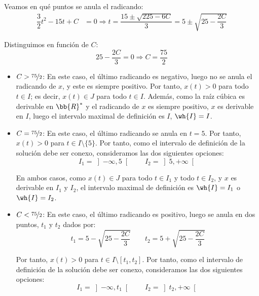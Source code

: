 \begin{ejercicio}
\begin{itemize}
        Veamos en qué puntos se anula el radicando:
        \begin{align*}
            \dfrac{3}{2}t^2 - 15t + C &= 0 \Longrightarrow t = \dfrac{15\pm\sqrt{225-6C}}{3} = 5\pm\sqrt{25-\dfrac{2C}{3}}
        \end{align*}

        Distinguimos en función de $C$:
        \begin{equation*}
            25 - \dfrac{2C}{3} = 0 \Longrightarrow C = \dfrac{75}{2}
        \end{equation*}
        \begin{itemize}
            \item \ul{$C>\nicefrac{75}{2}$}: En este caso, el último radicando es negativo, luego no se anula el radicando de $x$, y este es siempre positivo. Por tanto, $x(t)>0$ para todo $t\in I$; es decir, $x(t)\in J$ para todo $t\in I$. Además, como la raíz cúbica es derivable en $\bb{R}^\ast$ y el radicando de $x$ es siempre positivo, $x$ es derivable en $I$, luego el intervalo maximal de definición es $I$, $\wh{I}=I$.
            
            \item \ul{$C=\nicefrac{75}{2}$}: En este caso, el último radicando se anula en $t=5$. Por tanto, $x(t)>0$ para $t\in I\setminus \{5\}$. Por tanto, como el intervalo de definición de la solución debe ser conexo, consideramos las dos siguientes opciones:
            \begin{equation*}
                I_1 = \left]-\infty, 5\right[ \qquad I_2 = \left]5, +\infty\right[
            \end{equation*}

            En ambos casos, como $x(t)\in J$ para todo $t\in I_1$ y todo $t\in I_2$, y $x$ es derivable en $I_1$ y $I_2$, el intervalo maximal de definición es $\wh{I}=I_1$ o $\wh{I}=I_2$.

            \item \ul{$C<\nicefrac{75}{2}$}: En este caso, el último radicando es positivo, luego se anula en dos puntos, $t_1$ y $t_2$ dados por:
            \begin{equation*}
                t_1 = 5-\sqrt{25-\dfrac{2C}{3}} \qquad t_2 = 5+\sqrt{25-\dfrac{2C}{3}}
            \end{equation*}

            Por tanto, $x(t)>0$ para $t\in I\setminus [t_1,t_2]$. Por tanto, como el intervalo de definición de la solución debe ser conexo, consideramos las dos siguientes opciones:
            \begin{equation*}
                I_1 = \left]-\infty, t_1\right[ \qquad I_2 = \left]t_2, +\infty\right[
            \end{equation*}


\end{itemize}
\end{itemize}
\end{ejercicio}
